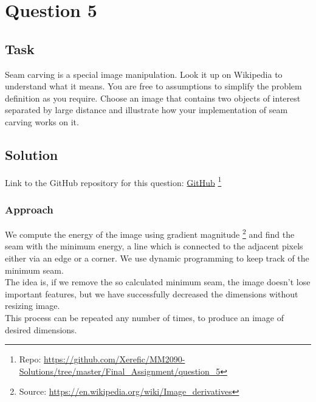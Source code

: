 \section{Question 5}

\subsection{Task}
Seam carving is a special image manipulation. Look it up on Wikipedia to understand what it means. You are free to assumptions to simplify the problem definition as you require. Choose an image that contains two objects of interest separated by large distance and illustrate how your implementation of seam carving works on it.


\subsection{Solution}

Link to the GitHub repository for this question: \href{https://github.com/Xerefic/MM2090-Solutions/tree/master/Final_Assignment/question_5}{GitHub} \footnote{Repo: \url{https://github.com/Xerefic/MM2090-Solutions/tree/master/Final_Assignment/question_5}}

\subsubsection{Approach}
We compute the energy of the image using gradient magnitude \footnote{Source: \url{https://en.wikipedia.org/wiki/Image_derivatives}} and find the seam with the minimum energy, a line which is connected to the adjacent pixels either via an edge or a corner. We use dynamic programming to keep track of the minimum seam. \\
The idea is, if we remove the so calculated minimum seam, the image doesn’t lose important features, but we have successfully decreased the dimensions without resizing image.\\
This process can be repeated any number of times, to produce an image of desired dimensions.

